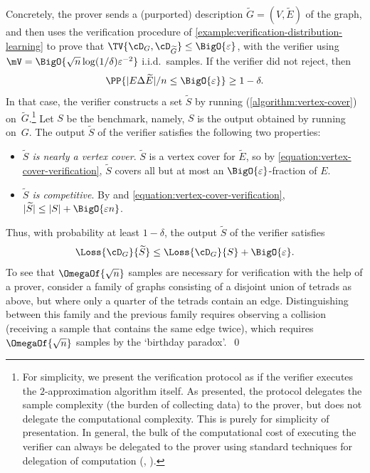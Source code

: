 \documentclass{toc}
\begin{document}
\begin{example}
	Concretely, the prover sends a (purported) description $\widetilde{G} = (V, \widetilde{E})$ of the graph, and then uses the verification procedure of \cref{example:verification-distribution-learning} to prove that $\TV{\cD_G,\cD_{\widetilde{G}}} \leq \BigO{\varepsilon}$, with the verifier using $\mV = \BigO{\sqrt{n}\log(1/\delta)\varepsilon^{-2}}$ i.i.d.\ samples.
	If the verifier did not reject, then 
	\begin{equation}
		\label{equation:vertex-cover-verification}
		\PP{|E \Delta \widetilde{E}|/n \leq \BigO{\varepsilon}} \geq 1-\delta.
	\end{equation}
	In that case, the verifier constructs a set $\widetilde{S}$ by running  (\cref{algorithm:vertex-cover}) on~$\widetilde{G}$.\footnote{%
	  For simplicity, we present the verification protocol as if the verifier executes the $2$-approximation algorithm itself. As presented, the protocol delegates the sample complexity (the burden of collecting data) to the prover, but does not delegate the computational complexity. This is purely for simplicity of presentation. In general, the bulk of the computational %
cost  %
of executing the verifier can always be delegated to the prover using standard techniques for delegation of computation (\eg, \cite{DBLP:journals/jacm/GoldwasserKR15}).%
	}
	Let $S$ be the benchmark, namely, $S$ is the output obtained by running  on~$G$.
	The output $\widetilde{S}$ of the verifier satisfies the following two properties:
	\begin{itemize}
		\item{
			\emph{$\widetilde{S}$ is nearly a vertex cover}. $\widetilde{S}$ is a vertex cover for $\widetilde{E}$, so by \cref{equation:vertex-cover-verification}, $\widetilde{S}$ covers all but at most an $\BigO{\varepsilon}$-fraction of $E$.
		}
		\item{
			\emph{$\widetilde{S}$ is competitive}. By  and \cref{equation:vertex-cover-verification}, $|\widetilde{S}| \leq |S| + \BigO{\varepsilon n}$.
		}
	\end{itemize}
	Thus, with probability at least $1-\delta$, the output $\widetilde{S}$ of the verifier satisfies
	\[
		\Loss{\cD_G}{\widetilde{S}} \leq \Loss{\cD_G}{S} + \BigO{\varepsilon}.
	\]
	To see that $\OmegaOf{\sqrt{n}}$ samples are necessary for verification with the help of a prover, consider a family of graphs consisting of a disjoint union of tetrads as above, but where only a quarter of the tetrads contain an edge. Distinguishing between this family and the previous family requires observing a collision (receiving a sample that contains the same edge twice), which requires $\OmegaOf{\sqrt{n}}$ samples by the `birthday paradox'.~\qed
\end{example}
\end{document}
